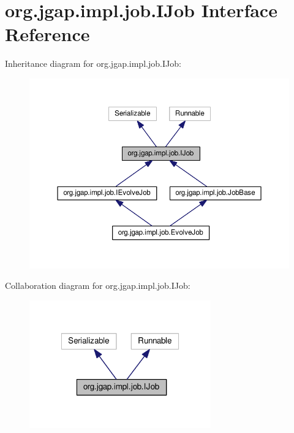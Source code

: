 \hypertarget{interfaceorg_1_1jgap_1_1impl_1_1job_1_1_i_job}{\section{org.\-jgap.\-impl.\-job.\-I\-Job Interface Reference}
\label{interfaceorg_1_1jgap_1_1impl_1_1job_1_1_i_job}
}


Inheritance diagram for org.\-jgap.\-impl.\-job.\-I\-Job\-:
\nopagebreak
\begin{figure}[H]
\begin{center}
\leavevmode
\includegraphics[width=350pt]{interfaceorg_1_1jgap_1_1impl_1_1job_1_1_i_job__inherit__graph}
\end{center}
\end{figure}


Collaboration diagram for org.\-jgap.\-impl.\-job.\-I\-Job\-:
\nopagebreak
\begin{figure}[H]
\begin{center}
\leavevmode
\includegraphics[width=222pt]{interfaceorg_1_1jgap_1_1impl_1_1job_1_1_i_job__coll__graph}
\end{center}
\end{figure}
